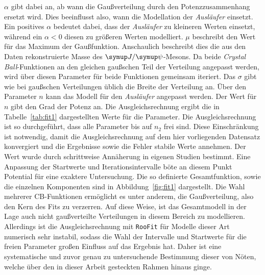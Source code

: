 %
$\alpha$ gibt dabei an, ab wann die Gaußverteilung durch den Potenzzusammenhang ersetzt wird. Dies beeinflusst also, wann die Modellation der \textit{Ausläufer}
einsetzt. Ein positives $\alpha$ bedeutet dabei, dass der \textit{Ausläufer} zu kleineren Werten einsetzt, während ein $\alpha<0$
diesen zu größeren Werten modelliert. $\mu$ beschreibt den Wert für das Maximum der Gaußfunktion. Anschaulich beschreibt dies die aus
den Daten rekonstruierte Masse des $\jpsi$-Mesons. Da beide \textit{Crystal Ball}-Funktionen an den gleichen gaußschen Teil der Verteilung angepasst werden,
wird über diesen Parameter für beide Funktionen gemeinsam iteriert. Das $\sigma$ gibt wie bei gaußschen Verteilungen üblich die Breite der Verteilung an. Über den Parameter $n$ kann das Modell für den \textit{Ausläufer} angepasst werden. Der Wert für $n$ gibt den Grad der Potenz an.
Die Ausgleichsrechnung ergibt die in Tabelle~\ref{tab:fit1} dargestellten Werte für die Parameter. Die Ausgleichsrechnung ist so durchgeführt, dass alle Parameter bis auf $n_2$ frei sind. Diese Einschränkung ist notwendig, damit die Ausgleichsrechnung auf dem hier vorliegenden Datensatz konvergiert und die Ergebnisse sowie die Fehler stabile Werte annehmen. Der Wert wurde durch schrittweise Annäherung in eigenen Studien bestimmt. Eine Anpassung der Startwerte und Iterationsintervalle böte an diesem Punkt Potential für eine exaktere Untersuchung. Die so definierte Gesamtfunktion, sowie die einzelnen Komponenten sind in Abbildung~\ref{fig:fit1} dargestellt. Die Wahl mehrerer CB-Funktionen ermöglicht es unter anderem, die Gaußverteilung, also den Kern des Fits zu verzerren. Auf diese Weise, ist das Gesamtmodell in der Lage auch nicht gaußverteilte Verteilungen in diesem Bereich zu modellieren. Allerdings ist die Ausgleichsrechnung mit \texttt{RooFit} für Modelle dieser Art numerisch sehr instabil, sodass die Wahl der Intervalle und Startwerte für die freien Parameter großen Einfluss auf das Ergebnis hat. Daher ist eine systematische und zuvor genau zu untersuchende Bestimmung dieser von Nöten, welche über den in dieser Arbeit gesteckten Rahmen hinaus ginge.

